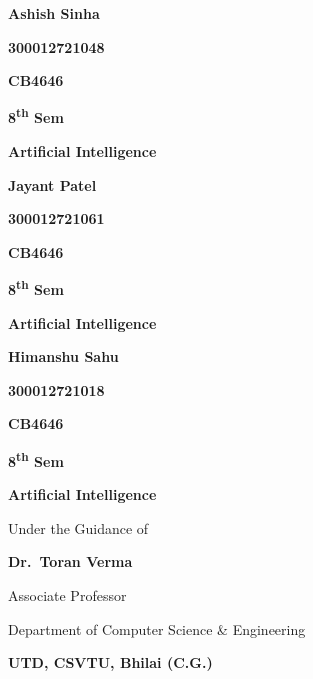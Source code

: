 \begin{titlepage}
  \begin{minipage}{0.33\textwidth}
    \centering
    \textbf{Ashish Sinha}\par
    \textbf{300012721048}\par 
    \textbf{CB4646}\par
    \textbf{8\textsuperscript{th} Sem}\par
    \textbf{Artificial Intelligence}\par
  \end{minipage}%
  \begin{minipage}{0.33\textwidth}
    \centering
    \textbf{Jayant Patel}\par
    \textbf{300012721061}\par 
    \textbf{CB4646}\par
    \textbf{8\textsuperscript{th} Sem}\par
    \textbf{Artificial Intelligence}\par
  \end{minipage}%
  \begin{minipage}{0.33\textwidth}
    \centering
    \textbf{Himanshu Sahu}\par
    \textbf{300012721018}\par 
    \textbf{CB4646}\par
    \textbf{8\textsuperscript{th} Sem}\par
    \textbf{Artificial Intelligence}\par
  \end{minipage}
  
  \vspace{0.5cm}
  
  Under the Guidance of\par
  \textbf{Dr.\ Toran Verma}\par
  Associate Professor\par 
  Department of Computer Science \& Engineering\par
  \textbf{UTD, CSVTU, Bhilai (C.G.)}\par
  
  \vspace{0.3cm}
  

\end{titlepage}

